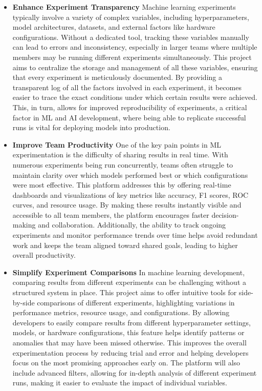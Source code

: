 \documentclass[12pt]{article}
\begin{document}
\begin{itemize}
\item \textbf{Enhance Experiment Transparency}
Machine learning experiments typically involve a variety of complex variables, including hyperparameters, model architectures, datasets, and external factors like hardware configurations. Without a dedicated tool, tracking these variables manually can lead to errors and inconsistency, especially in larger teams where multiple members may be running different experiments simultaneously\cite{silva2020benchmarking}. This project aims to centralize the storage and management of all these variables, ensuring that every experiment is meticulously documented. By providing a transparent log of all the factors involved in each experiment, it becomes easier to trace the exact conditions under which certain results were achieved. This, in turn, allows for improved reproducibility of experiments, a critical factor in ML and AI development, where being able to replicate successful runs is vital for deploying models into production\cite{banerjee2020challenges}.

\item \textbf{Improve Team Productivity}
One of the key pain points in ML experimentation is the difficulty of sharing results in real time. With numerous experiments being run concurrently, teams often struggle to maintain clarity over which models performed best or which configurations were most effective. This platform addresses this by offering real-time dashboards and visualizations of key metrics like accuracy, F1 scores, ROC curves, and resource usage\cite{vuppalapati2020automating}. By making these results instantly visible and accessible to all team members, the platform encourages faster decision-making and collaboration. Additionally, the ability to track ongoing experiments and monitor performance trends over time helps avoid redundant work and keeps the team aligned toward shared goals, leading to higher overall productivity\cite{karn2018dynamic}.

\item \textbf{Simplify Experiment Comparisons}
In machine learning development, comparing results from different experiments can be challenging without a structured system in place. This project aims to offer intuitive tools for side-by-side comparisons of different experiments, highlighting variations in performance metrics, resource usage, and configurations\cite{karamitsos2020applying}. By allowing developers to easily compare results from different hyperparameter settings, models, or hardware configurations, this feature helps identify patterns or anomalies that may have been missed otherwise. This improves the overall experimentation process by reducing trial and error and helping developers focus on the most promising approaches early on\cite{cloudcalc}. The platform will also include advanced filters, allowing for in-depth analysis of different experiment runs, making it easier to evaluate the impact of individual variables.


\end{itemize}
\end{document}
